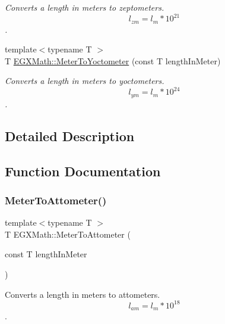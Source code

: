 \begin{DoxyCompactItemize}
\begin{DoxyCompactList}\small\item\em Converts a length in meters to zeptometers. \[ l_{zm}=l_{m} * 10^{21} \]. \end{DoxyCompactList}\item 
{\footnotesize template$<$typename T $>$ }\\T \mbox{\hyperlink{group___e_g_x_math-_conversions-_length_conversions-_meter-_s_i_ga0a9af3add4234d53c0ea30906ead1c3a}{E\+G\+X\+Math\+::\+Meter\+To\+Yoctometer}} (const T length\+In\+Meter)
\begin{DoxyCompactList}\small\item\em Converts a length in meters to yoctometers. \[ l_{ym}=l_{m} * 10^{24} \]. \end{DoxyCompactList}\end{DoxyCompactItemize}


\subsection{Detailed Description}


\subsection{Function Documentation}
\mbox{\label{group___e_g_x_math-_conversions-_length_conversions-_meter-_s_i_ga7c27a5231b96b904786f519e8bad257c}} 
\subsubsection{\texorpdfstring{Meter\+To\+Attometer()}{MeterToAttometer()}}
{\footnotesize\ttfamily template$<$typename T $>$ \\
T E\+G\+X\+Math\+::\+Meter\+To\+Attometer (\begin{DoxyParamCaption}\item[{const T}]{length\+In\+Meter }\end{DoxyParamCaption})}



Converts a length in meters to attometers. \[ l_{am}=l_{m} * 10^{18} \]. 


